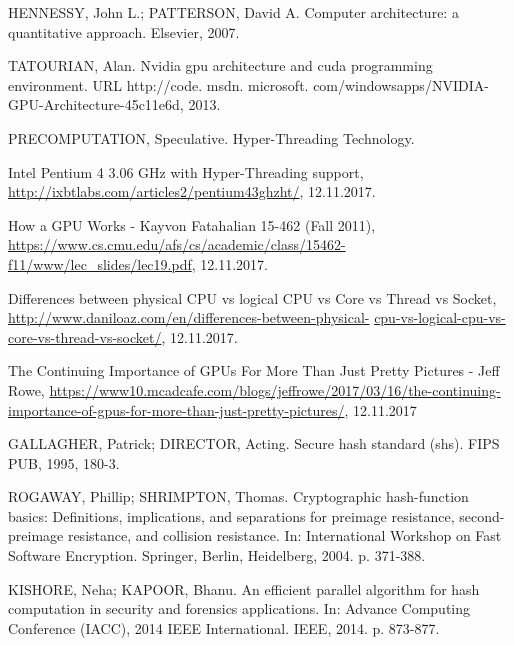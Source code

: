 \documentclass[conference]{IEEEtran}
\begin{document}
\begin{thebibliography}{1}

HENNESSY, John L.; PATTERSON, David A. Computer architecture: a quantitative approach. Elsevier, 2007.

TATOURIAN, Alan. Nvidia gpu architecture and cuda programming environment. URL http://code. msdn. microsoft. com/windowsapps/NVIDIA-GPU-Architecture-45c11e6d, 2013.

PRECOMPUTATION, Speculative. Hyper-Threading Technology.

Intel Pentium 4 3.06 GHz with Hyper-Threading support, \url{http://ixbtlabs.com/articles2/pentium43ghzht/}, 12.11.2017.

How a GPU Works - Kayvon Fatahalian 15-462 (Fall 2011), \url{https://www.cs.cmu.edu/afs/cs/academic/class/15462-f11/www/lec_slides/lec19.pdf}, 12.11.2017.

Differences between physical CPU vs logical CPU vs Core vs Thread vs Socket, \url{http://www.daniloaz.com/en/differences-between-physical-} \url{cpu-vs-logical-cpu-vs-core-vs-thread-vs-socket/}, 12.11.2017.

The Continuing Importance of GPUs For More Than Just Pretty Pictures - Jeff Rowe, \url{https://www10.mcadcafe.com/blogs/jeffrowe/2017/03/16/the-continuing-importance-of-gpus-for-more-than-just-pretty-pictures/}, 12.11.2017

GALLAGHER, Patrick; DIRECTOR, Acting. Secure hash standard (shs). FIPS PUB, 1995, 180-3.

ROGAWAY, Phillip; SHRIMPTON, Thomas. Cryptographic hash-function basics: Definitions, implications, and separations for preimage resistance, second-preimage resistance, and collision resistance. In: International Workshop on Fast Software Encryption. Springer, Berlin, Heidelberg, 2004. p. 371-388.

KISHORE, Neha; KAPOOR, Bhanu. An efficient parallel algorithm for hash computation in security and forensics applications. In: Advance Computing Conference (IACC), 2014 IEEE International. IEEE, 2014. p. 873-877.

\end{thebibliography}
\end{document}
